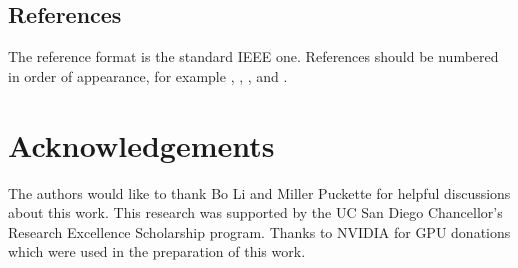 \documentclass[a4paper]{article}
\begin{document}
\subsection{References}

The reference format is the standard IEEE one. References should be numbered in order of appearance, for example \cite{Davis80-COP}, \cite{Rabiner89-ATO}, \cite[pp.\ 417--422]{Hastie09-TEO}, and \cite{YourName17-XXX}.

\section{Acknowledgements}

The authors would like to thank Bo Li and Miller Puckette for helpful discussions about this work. 
This research was supported by the UC San Diego Chancellor’s Research Excellence Scholarship program.
Thanks to NVIDIA for GPU donations which were used in the preparation of this work.






\end{document}

